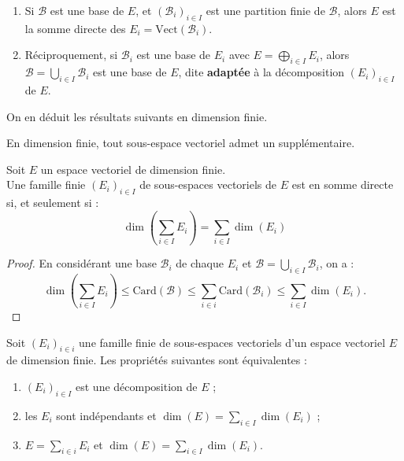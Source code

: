 \documentclass[french]{article}
\newcommand{\card}{\text{Card}}
\newcommand{\Vect}{\text{Vect}}
\theoremstyle{plain}
\theoremstyle{definition}
\theoremstyle{remark}
\begin{document}
\begin{prop}%
	\begin{enumerate}
		\item Si $\mathcal{B}$ est une base de $E$, et $(\mathcal{B}_i)_{i\in I}$ est une partition finie de $\mathcal{B}$, alors $E$ est la somme directe des $E_i=\Vect(\mathcal{B}_i)$.
		\item Réciproquement, si $\mathcal{B}_i$ est une base de $E_i$ avec $E=\displaystyle\bigoplus_{i\in I}E_i$, alors $\mathcal{B}=\displaystyle\bigcup_{i\in I}\mathcal{B}_i$ est une base de $E$, dite \textbf{adaptée} à la décomposition $(E_i)_{i\in I}$ de $E$.
	\end{enumerate}
\end{prop}

On en déduit les résultats suivants en dimension finie.

\begin{cor}%
	En dimension finie, tout sous-espace vectoriel admet un supplémentaire.
\end{cor}

\begin{cor}%
	Soit $E$ un espace vectoriel de dimension finie. \\
	Une famille finie $(E_i)_{i\in I}$ de sous-espaces vectoriels de $E$ est en somme directe si, et seulement si : $$\dim\left(\sum_{i\in I}E_i\right)=\sum_{i\in I}\dim(E_i)$$
\end{cor}
\begin{proof}
	En considérant une base $\mathcal{B}_i$ de chaque $E_i$ et $\mathcal{B}=\displaystyle\bigcup_{i\in I}\mathcal{B}_i$, on a : $$\dim\left(\sum_{i\in I}E_i\right)\leqslant\card(\mathcal{B})\leqslant\sum_{i\in i}\card(\mathcal{B}_i)\leqslant\sum_{i\in I}\dim(E_i).$$
\end{proof}

\begin{cor}%
	Soit $(E_i)_{i\in i}$ une famille finie de sous-espaces vectoriels d'un espace vectoriel $E$ de dimension finie. Les propriétés suivantes sont équivalentes :
	\begin{enumerate}[label=(\roman*)]
		\item $(E_i)_{i\in I}$ est une décomposition de $E$ ;
		\item les $E_i$ sont indépendants et $\displaystyle\dim(E)=\sum_{i\in I}\dim(E_i)$ ;
		\item $E=\displaystyle\sum_{i\in i}E_i$ et $\displaystyle\dim(E)=\sum_{i\in I}\dim(E_i)$.
	\end{enumerate}
\end{cor}
\end{document}
